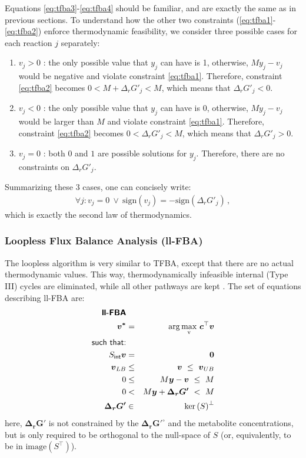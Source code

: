 \documentclass[10pt,a4paper]{article}
\newcommand{\mymatrix}[1]{#1}
\newcommand{\myvector}[1]{{\boldsymbol{#1}}}
\newcommand{\stoichmat}{\mymatrix{S}}
\newcommand{\stoichmatint}{\mymatrix{S}_{\mathsf{int}}}
\begin{document}
Equations \ref{eq:tfba3}-\ref{eq:tfba4} should be familiar, and are exactly the same as in previous sections. To understand how the other two constraints (\ref{eq:tfba1}-\ref{eq:tfba2}) enforce thermodynamic feasibility, we consider three possible cases for each reaction $j$ separately:
\begin{enumerate}
	\item $v_j > 0$ : the only possible value that $y_j$ can have is 1, otherwise, $My_j - v_j$ would be negative and violate constraint \ref{eq:tfba1}. Therefore, constraint \ref{eq:tfba2} becomes $0 < M + \Delta_r G'_j < M$, which means that $\Delta_r G'_j < 0$.
	\item $v_j < 0$ : the only possible value that $y_j$ can have is 0, otherwise, $My_j - v_j$ would be larger than $M$ and violate constraint \ref{eq:tfba1}. Therefore, constraint \ref{eq:tfba2} becomes $0 < \Delta_r G'_j < M$, which means that $\Delta_r G'_j > 0$.
	\item $v_j = 0$ : both $0$ and $1$ are possible solutions for $y_j$. Therefore, there are no constraints on $\Delta_r G'_j$.
\end{enumerate}
Summarizing these 3 cases, one can concisely write:
\begin{eqnarray}
\forall j:v_j = 0~\vee~\text{sign}(v_j) = -\text{sign}(\Delta_r G'_j)\,,
\end{eqnarray}
which is exactly the second law of thermodynamics.

\subsubsection{Loopless Flux Balance Analysis (ll-FBA)}
The loopless algorithm \cite{schellenberger_elimination_2011} is very similar to TFBA, except that there are no actual thermodynamic values. This way, thermodynamically infeasible internal (Type III) cycles are eliminated, while all other pathways are kept \cite{noor_proof_2012}. The set of equations describing ll-FBA are:
\begin{eqnarray}
\textsf{\textbf{ll-FBA}} && \nonumber\\
\myvector{v^*} &=& \mathrm{arg\max_v} {~\myvector{c}^\top\myvector{v}}\nonumber\\
\textsf{such that:} && \nonumber\\
\stoichmatint \myvector{v} &=& \myvector{0} \label{eq:llfba1} \\
\myvector{v}_{LB} &\leq& \myvector{v} ~\leq~ \myvector{v}_{UB} \\
0 &\leq& M \myvector{y} - \myvector{v} ~\leq~ M
\label{eq:llfba2} \\
0 &<& M \myvector{y} + \myvector{\Delta_r G'} ~<~ M \label{eq:llfba3} \\
\myvector{\Delta_r G'} &\in& \ker{(\stoichmat)}^\perp \label{eq:llfba5}
\end{eqnarray}
here, $\myvector{\Delta_r G'}$ is not constrained by the $\myvector{\Delta_r G'}^\circ$ and the metabolite concentrations, but is only required to be orthogonal to the null-space of $\stoichmat$ (or, equivalently, to be in $\mathrm{image}(\stoichmat^\top)$).
\end{document}
